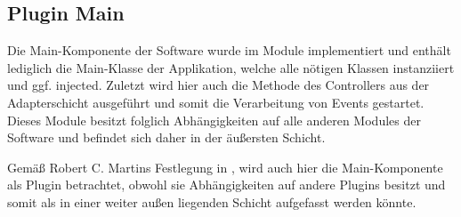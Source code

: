 \subsection{Plugin Main}
Die Main-Komponente der Software wurde im Module \href{https://github.com/anditru/quickie/tree/bb41442c7f1ffbfcd3117cd86a40f7932e543a33/0-quickie-plugin-main}{} implementiert und enthält lediglich die Main-Klasse der Applikation, welche alle nötigen Klassen instanziiert und ggf. injected. Zuletzt wird hier auch die Methode  des Controllers aus der Adapterschicht ausgeführt und somit die Verarbeitung von Events gestartet. Dieses Module besitzt folglich Abhängigkeiten auf alle anderen Modules der Software und befindet sich daher in der äußersten Schicht.

Gemäß Robert C. Martins Festlegung in \cite{Martin.2018}, wird auch hier die Main-Komponente als Plugin betrachtet, obwohl sie Abhängigkeiten auf andere Plugins besitzt und somit als in einer weiter außen liegenden Schicht aufgefasst werden könnte.
